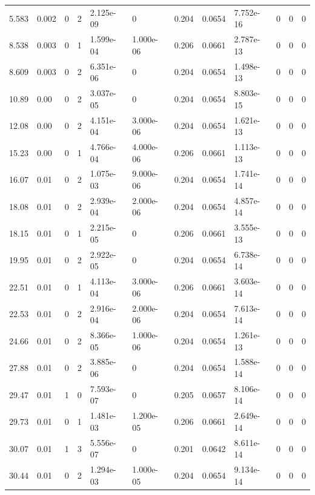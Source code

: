 \documentclass[preview]{standalone}
\begin{document}
{{\begin{tabular}{L{1.2cm}C{1.2cm} C{0.3cm}C{0.5cm} C{1.4cm}C{1.4cm} C{1.4cm}C{1.4cm} C{1.6cm}C{1.6cm} C{1.6cm}C{1.6cm}}
  5.583  &  0.002  & 0     &  2 &  2.125e-09  & 0  &  0.204&   0.0654& 7.752e-16 & 0   &  0 & 0  \\ 
  8.538  &  0.003  & 0     &  1 &  1.599e-04  & 1.000e-06  &  0.206&   0.0661& 2.787e-13 & 0   &  0 & 0  \\ 
  8.609  &  0.003  & 0     &  2 &  6.351e-06  & 0  &  0.204&   0.0654& 1.498e-13 & 0   &  0 & 0  \\ 
  10.89  &  0.00  & 0     &  2 &  3.037e-05  & 0  &  0.204&   0.0654& 8.803e-15 & 0   &  0 & 0  \\ 
  12.08  &  0.00  & 0     &  2 &  4.151e-04  & 3.000e-06  &  0.204&   0.0654& 1.621e-13 & 0   &  0 & 0  \\ 
  15.23  &  0.00  & 0     &  1 &  4.766e-04  & 4.000e-06  &  0.206&   0.0661& 1.113e-13 & 0   &  0 & 0  \\ 
  16.07  &  0.01  & 0     &  2 &  1.075e-03  & 9.000e-06  &  0.204&   0.0654& 1.741e-14 & 0   &  0 & 0  \\ 
  18.08  &  0.01  & 0     &  2 &  2.939e-04  & 2.000e-06  &  0.204&   0.0654& 4.857e-14 & 0   &  0 & 0  \\ 
  18.15  &  0.01  & 0     &  1 &  2.215e-05  & 0  &  0.206&   0.0661& 3.555e-13 & 0   &  0 & 0  \\ 
  19.95  &  0.01  & 0     &  2 &  2.922e-05  & 0  &  0.204&   0.0654& 6.738e-14 & 0   &  0 & 0  \\ 
  22.51  &  0.01  & 0     &  1 &  4.113e-04  & 3.000e-06  &  0.206&   0.0661& 3.603e-14 & 0   &  0 & 0  \\ 
  22.53  &  0.01  & 0     &  2 &  2.916e-04  & 2.000e-06  &  0.204&   0.0654& 7.613e-14 & 0   &  0 & 0  \\ 
  24.66  &  0.01  & 0     &  2 &  8.366e-05  & 1.000e-06  &  0.204&   0.0654& 1.261e-13 & 0   &  0 & 0  \\ 
  27.88  &  0.01  & 0     &  2 &  3.885e-06  & 0  &  0.204&   0.0654& 1.588e-14 & 0   &  0 & 0  \\ 
  29.47  &  0.01  & 1     &  0 &  7.593e-07  & 0  &  0.205&   0.0657& 8.106e-14 & 0   &  0 & 0  \\ 
  29.73  &  0.01  & 0     &  1 &  1.481e-03  & 1.200e-05  &  0.206&   0.0661& 2.649e-14 & 0   &  0 & 0  \\ 
  30.07  &  0.01  & 1     &  3 &  5.556e-07  & 0  &  0.201&   0.0642& 8.611e-14 & 0   &  0 & 0  \\ 
  30.44  &  0.01  & 0     &  2 &  1.294e-03  & 1.000e-05  &  0.204&   0.0654& 9.134e-14 & 0   &  0 & 0  \\ 

\end{tabular}}}
\end{document}
